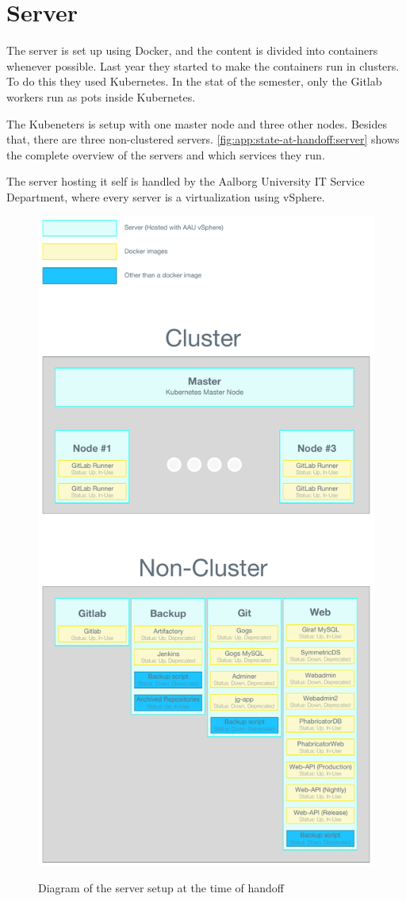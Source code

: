 \section{Server}\label{app:state-at-handoff:server}

The server is set up using Docker, and the content is divided into containers whenever possible. 
Last year they started to make the containers run in clusters. 
To do this they used Kubernetes. In the stat of the semester, only the Gitlab workers run as pots inside Kubernetes.

The Kubeneters is setup with one master node and three other nodes. Besides that, there are three non-clustered servers. \autoref{fig:app:state-at-handoff:server} shows the complete overview of the servers and which services they run.

The server hosting it self is handled by the Aalborg University IT Service Department, where every server is a virtualization using vSphere.

\begin{figure}[h]
    \centering
    \caption{Diagram of the server setup at the time of handoff}
    \includegraphics[height=1\textheight]{figures/Server-Overview.pdf}
    \label{fig:app:state-at-handoff:server}
\end{figure}
